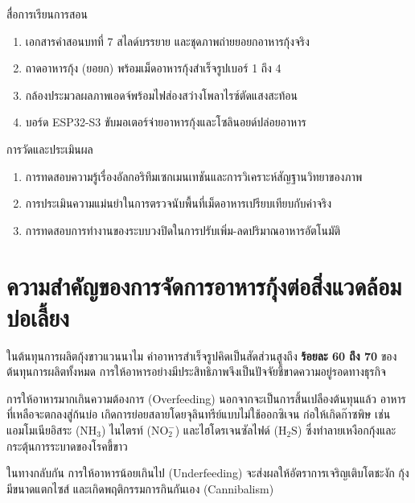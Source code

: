 \begin{planbox}{สื่อการเรียนการสอน}
\begin{enumerate}[topsep=2pt, itemsep=1pt, partopsep=0pt, parsep=0pt, leftmargin=1.5em]
    \item เอกสารคำสอนบทที่ 7 สไลด์บรรยาย และชุดภาพถ่ายยอยกอาหารกุ้งจริง
    \item ถาดอาหารกุ้ง (ยอยก) พร้อมเม็ดอาหารกุ้งสำเร็จรูปเบอร์ 1 ถึง 4
    \item กล้องประมวลผลภาพเอดจ์พร้อมไฟส่องสว่างโพลาไรซ์ตัดแสงสะท้อน
    \item บอร์ด ESP32-S3 ขับมอเตอร์จ่ายอาหารกุ้งและโซลินอยด์ปล่อยอาหาร
\end{enumerate}
\end{planbox}

\begin{planbox}{การวัดและประเมินผล}
\begin{enumerate}[topsep=2pt, itemsep=1pt, partopsep=0pt, parsep=0pt, leftmargin=1.5em]
    \item การทดสอบความรู้เรื่องอัลกอริทึมเซกเมนเทชันและการวิเคราะห์สัญฐานวิทยาของภาพ
    \item การประเมินความแม่นยำในการตรวจนับพื้นที่เม็ดอาหารเปรียบเทียบกับค่าจริง
    \item การทดสอบการทำงานของระบบวงปิดในการปรับเพิ่ม-ลดปริมาณอาหารอัตโนมัติ
\end{enumerate}
\end{planbox}

\clearpage

\section{ความสำคัญของการจัดการอาหารกุ้งต่อสิ่งแวดล้อมบ่อเลี้ยง}

ในต้นทุนการผลิตกุ้งขาวแวนนาไม ค่าอาหารสำเร็จรูปคิดเป็นสัดส่วนสูงถึง \textbf{ร้อยละ 60 ถึง 70} ของต้นทุนการผลิตทั้งหมด การให้อาหารอย่างมีประสิทธิภาพจึงเป็นปัจจัยชี้ขาดความอยู่รอดทางธุรกิจ

การให้อาหารมากเกินความต้องการ (Overfeeding) นอกจากจะเป็นการสิ้นเปลืองต้นทุนแล้ว อาหารที่เหลือจะตกลงสู่ก้นบ่อ เกิดการย่อยสลายโดยจุลินทรีย์แบบไม่ใช้ออกซิเจน ก่อให้เกิดก๊าซพิษ เช่น แอมโมเนียอิสระ ($\text{NH}_3$) ไนไตรท์ ($\text{NO}_2^-$) และไฮโดรเจนซัลไฟด์ ($\text{H}_2\text{S}$) ซึ่งทำลายเหงือกกุ้งและกระตุ้นการระบาดของโรคขี้ขาว

ในทางกลับกัน การให้อาหารน้อยเกินไป (Underfeeding) จะส่งผลให้อัตราการเจริญเติบโตชะงัก กุ้งมีขนาดแตกไซส์ และเกิดพฤติกรรมการกินกันเอง (Cannibalism)

